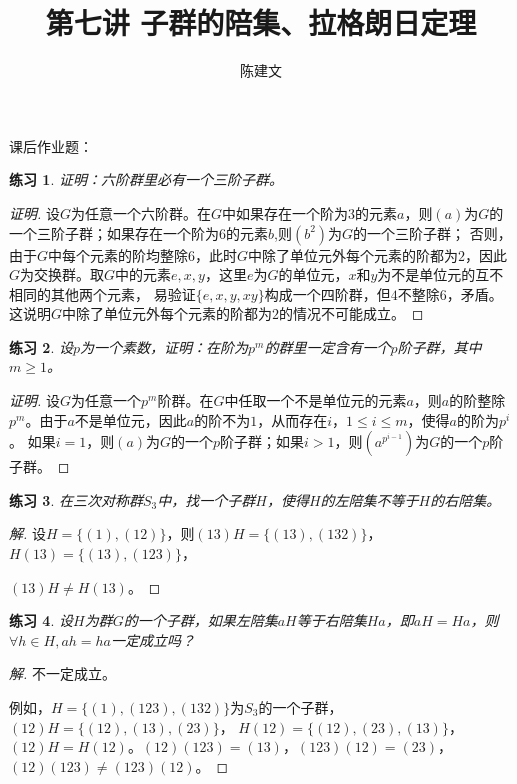 \documentclass{article}
\newtheorem{Exercise}{练习}
\begin{document}
\begin{CJK*}{UTF8}{gbsn}
  \title{第七讲 子群的陪集、拉格朗日定理}
  \author{陈建文}
  \maketitle
  
  
课后作业题：
\begin{Exercise}
证明：六阶群里必有一个三阶子群。
\end{Exercise}
\begin{proof}[证明]
  设$G$为任意一个六阶群。在$G$中如果存在一个阶为$3$的元素$a$，则$(a)$为$G$的一个三阶子群；如果存在一个阶为$6$的元素$b$,则$(b^2)$为$G$的一个三阶子群；
否则，由于$G$中每个元素的阶均整除$6$，此时$G$中除了单位元外每个元素的阶都为$2$，因此$G$为交换群。取$G$中的元素$e,x,y$，这里$e$为$G$的单位元，$x$和$y$为不是单位元的互不相同的其他两个元素，
易验证$\{e,x,y,xy\}$构成一个四阶群，但$4$不整除$6$，矛盾。这说明$G$中除了单位元外每个元素的阶都为$2$的情况不可能成立。
\end{proof}
\begin{Exercise}
设$p$为一个素数，证明：在阶为$p^m$的群里一定含有一个$p$阶子群，其中$m\geq 1$。
\end{Exercise}
\begin{proof}[证明]
  设$G$为任意一个$p^m$阶群。在$G$中任取一个不是单位元的元素$a$，则$a$的阶整除$p^m$。由于$a$不是单位元，因此$a$的阶不为$1$，从而存在$i$，$1\leq i\leq m$，使得$a$的阶为$p^i$。
  如果$i=1$，则$(a)$为$G$的一个$p$阶子群；如果$i>1$，则$(a^{p^{i-1}})$为$G$的一个$p$阶子群。
\end{proof}
\begin{Exercise}
在三次对称群$S_3$中，找一个子群$H$，使得$H$的左陪集不等于$H$的右陪集。
\end{Exercise}
\begin{proof}[解]
  设$H=\{(1),(12)\}$，则$(13)H=\{(13),(132)\}$，$H(13)=\{(13),(123)\}$， 
  
  $(13)H\neq H(13)$。
\end{proof}
\begin{Exercise}
设$H$为群$G$的一个子群，如果左陪集$aH$等于右陪集$Ha$，即$aH=Ha$，则$\forall h\in H, ah=ha$一定成立吗？
\end{Exercise}
\begin{proof}[解]
  不一定成立。

  例如，$H=\{(1),(123),(132)\}$为$S_3$的一个子群，$(12)H=\{(12),(13),(23)\}$，
  $H(12)=\{(12),(23),(13)\}$，$(12)H=H(12)$。$(12)(123)=(13)$，$(123)(12)=(23)$，$(12)(123)\neq (123)(12)$。
\end{proof}
\end{CJK*}
\end{document}

